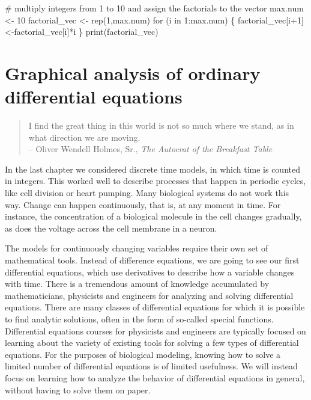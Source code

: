 \documentclass[
  letterpaper,
  DIV=11,
  numbers=noendperiod]{scrreprt}
\newenvironment{Shaded}{\begin{snugshade}}{\end{snugshade}}
\newcommand{\CommentTok}[1]{\textcolor[rgb]{0.37,0.37,0.37}{#1}}
\newcommand{\ControlFlowTok}[1]{\textcolor[rgb]{0.00,0.23,0.31}{#1}}
\newcommand{\DecValTok}[1]{\textcolor[rgb]{0.68,0.00,0.00}{#1}}
\newcommand{\FunctionTok}[1]{\textcolor[rgb]{0.28,0.35,0.67}{#1}}
\newcommand{\NormalTok}[1]{\textcolor[rgb]{0.00,0.23,0.31}{#1}}
\newcommand{\OtherTok}[1]{\textcolor[rgb]{0.00,0.23,0.31}{#1}}
\newcommand{\SpecialCharTok}[1]{\textcolor[rgb]{0.37,0.37,0.37}{#1}}
\begin{document}
\begin{Shaded}
\begin{Highlighting}[]
\CommentTok{\# multiply integers from 1 to 10 and assign the factorials to the vector }
\NormalTok{max.num }\OtherTok{\textless{}{-}} \DecValTok{10}
\NormalTok{factorial\_vec }\OtherTok{\textless{}{-}} \FunctionTok{rep}\NormalTok{(}\DecValTok{1}\NormalTok{,max.num)}
\ControlFlowTok{for}\NormalTok{ (i }\ControlFlowTok{in} \DecValTok{1}\SpecialCharTok{:}\NormalTok{max.num) \{}
\NormalTok{  factorial\_vec[i}\SpecialCharTok{+}\DecValTok{1}\NormalTok{]}\OtherTok{\textless{}{-}}\NormalTok{factorial\_vec[i]}\SpecialCharTok{*}\NormalTok{i}
\NormalTok{\}}
\FunctionTok{print}\NormalTok{(factorial\_vec)}
\end{Highlighting}
\end{Shaded}


\hypertarget{graphical-analysis-of-ordinary-differential-equations}{%
\chapter{Graphical analysis of ordinary differential
equations}\label{graphical-analysis-of-ordinary-differential-equations}}


\begin{quote}
I find the great thing in this world is not so much where we stand, as
in what direction we are moving.\\
-- Oliver Wendell Holmes, Sr., \emph{The Autocrat of the Breakfast
Table}
\end{quote}

In the last chapter we considered discrete time models, in which time is
counted in integers. This worked well to describe processes that happen
in periodic cycles, like cell division or heart pumping. Many biological
systems do not work this way. Change can happen continuously, that is,
at any moment in time. For instance, the concentration of a biological
molecule in the cell changes gradually, as does the voltage across the
cell membrane in a neuron.

The models for continuously changing variables require their own set of
mathematical tools. Instead of difference equations, we are going to see
our first differential equations, which use derivatives to describe how
a variable changes with time. There is a tremendous amount of knowledge
accumulated by mathematicians, physicists and engineers for analyzing
and solving differential equations. There are many classes of
differential equations for which it is possible to find analytic
solutions, often in the form of so-called special functions.
Differential equations courses for physicists and engineers are
typically focused on learning about the variety of existing tools for
solving a few types of differential equations. For the purposes of
biological modeling, knowing how to solve a limited number of
differential equations is of limited usefulness. We will instead focus
on learning how to analyze the behavior of differential equations in
general, without having to solve them on paper.
\end{document}
